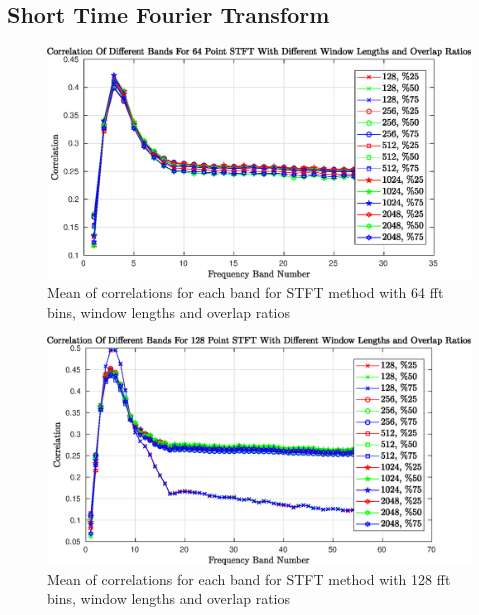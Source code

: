 \subsection{Short Time Fourier Transform}
\begin{figure}[h!]
	\begin{center}
		\includegraphics[width=\textwidth]{figures/corr_normal_for_stft_64.eps}
		\caption{Mean of correlations for each band for STFT method with 64 fft bins, window lengths and overlap ratios}
		\label{fig:airflow_stft_64}
	\end{center}
\end{figure}
\begin{figure}[h!]
	\begin{center}
		\includegraphics[width=\textwidth]{figures/corr_normal_for_stft_128.eps}
		\caption{Mean of correlations for each band for STFT method with 128 fft bins, window lengths and overlap ratios}
		\label{fig:airflow_stft_128}
	\end{center}
\end{figure}
